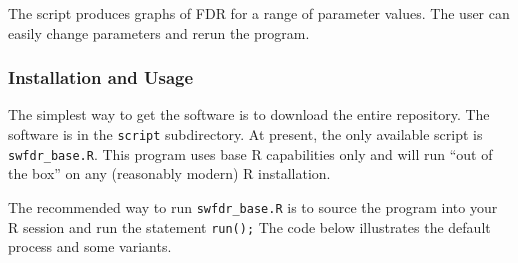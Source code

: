 \documentclass[]{article}
\begin{document}
The script produces graphs of FDR for a range of parameter values. The
user can easily change parameters and rerun the program.

\subsubsection{Installation and Usage}\label{installation-and-usage}

The simplest way to get the software is to download the entire
repository. The software is in the \texttt{script} subdirectory. At
present, the only available script is \texttt{swfdr\_base.R}. This
program uses base R capabilities only and will run ``out of the box'' on
any (reasonably modern) R installation.

The recommended way to run \texttt{swfdr\_base.R} is to source the
program into your R session and run the statement \texttt{run();} The
code below illustrates the default process and some variants.
\end{document}

